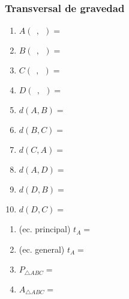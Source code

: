 \documentclass[12pt,spanish,x11names]{beamer}
\title{\talktitle}
\subtitle{\talksubtitle}
\author{\talkauthor}
\institute{\talkaffiliation}
\date{\footnotesize{\emph{\href{\talkblog}{\talkemail}}}}
\begin{document}
\begin{frame}
\titlepage
\end{frame}
\begin{frame}
  \frametitle{Transversal de gravedad}
  \begin{minipage}[t]{.45\linewidth}
     \begin{figure}[h]
      \centering
    \end{figure}
  \end{minipage}
  \begin{minipage}[t]{.25\linewidth}
    \begin{enumerate}
    \item $A(\ \ ,\ \ )=$
    \item $B(\ \ ,\ \ )=$
    \item $C(\ \ ,\ \ )=$
    \item $D(\ \ ,\ \ )=$
    \item $d(A,B)=$
    \item $d(B,C)=$
    \item $d(C,A)=$
    \item $d(A,D)=$
    \item $d(D,B)=$
    \item $d(D,C)=$
    \end{enumerate}
  \end{minipage}
  \begin{minipage}[t]{.25\linewidth}
    \begin{enumerate}
    \item (ec. principal) $t_A=$
    \item (ec. general) $t_A=$
    \item $P_{\triangle ABC}=$
    \item $A_{\triangle ABC}=$
    \end{enumerate}
  \end{minipage}
\end{frame}
\end{document}
